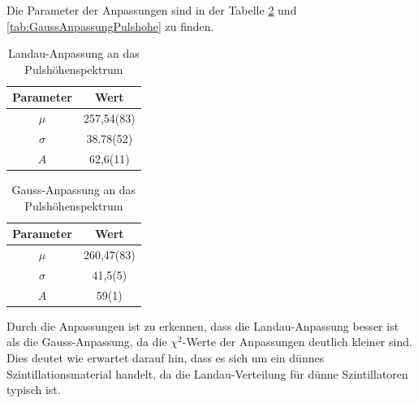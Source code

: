 \documentclass{article}
\begin{document}
Die Parameter der Anpassungen sind in der Tabelle \ref{tab:LandauAnpassungPulshohe} und \ref{tab:GaussAnpassungPulshohe} zu finden.
\begin{table}[H]
    \centering
    \caption{Landau-Anpassung an das Pulshöhenspektrum}
    \begin{tabular}{|c|c|}
        \hline
        Parameter & Wert \\ \hline
        $\mu$ & 257,54(83) \\ \hline
        $\sigma$ & 38.78(52) \\ \hline
        $A$ & 62,6(11) \\ \hline
    \end{tabular}
    \label{tab:LandauAnpassungPulshohe}
\end{table}
\begin{table}[H]
    \centering
    \caption{Gauss-Anpassung an das Pulshöhenspektrum}
    \begin{tabular}{|c|c|}
        \hline
        Parameter & Wert \\ \hline
        $\mu$ & 260,47(83) \\ \hline
        $\sigma$ & 41,5(5) \\ \hline
        $A$ & 59(1) \\ \hline
    \end{tabular}
    \label{tab:LandauAnpassungPulshohe}
\end{table}

Durch die Anpassungen ist zu erkennen, dass die Landau-Anpassung besser ist als die Gauss-Anpassung, da die $\chi^2$-Werte der Anpassungen deutlich kleiner sind.
Dies deutet wie erwartet darauf hin, dass es sich um ein dünnes Szintillationsmaterial handelt, da die Landau-Verteilung für dünne Szintillatoren typisch ist.
\end{document}
